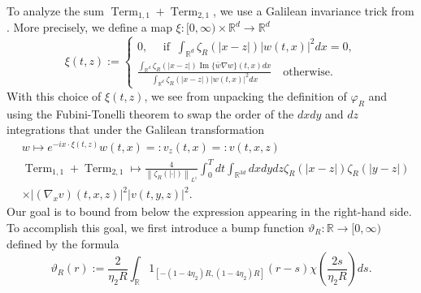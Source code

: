 \documentclass[reqno,11pt]{amsart}
\theoremstyle{plain}
\theoremstyle{definition}
\numberwithin{equation}{section}
\numberwithin{theorem}{section}
\begin{document}
To analyze the sum $\operatorname{Term}_{1,1}+\operatorname{Term}_{2,1}$, we use a Galilean invariance trick from \cite{Dodson-Adv}. More precisely, we define a map $\xi:[0, \infty) \times \mathbb{R}^{d} \rightarrow \mathbb{R}^{d}$
\begin{equation*}
\xi(t, z):=
\begin{cases}
0, \quad \text{ if }\ \int_{\mathbb{R}^{d}} \zeta_{R}\left(\left| x-z\right|\right)|w(t, x)|^{2} d x=0,\\
    \frac{\int_{\mathbb{R}^{d}} \zeta_{R}\left(\left| x-z\right|\right) \operatorname{Im}\{\bar{w} \nabla w\}(t, x) d x}{\int_{\mathbb{R}^{d}} \zeta_{R}\left(\left| x-z\right|\right)|w(t, x)|^{2} d x} \quad \text{otherwise}.
\end{cases}
\end{equation*}
 With this choice of $\xi(t, z)$, we see from unpacking the definition of $\varphi_{R}$ and using the Fubini-Tonelli theorem to swap the order of the $d x d y$ and $d z$ integrations that under the Galilean transformation
\begin{align*}
& w \mapsto e^{-i x \cdot \xi(t, z)} w(t, x)=: v_{z}(t, x)=: v(t, x, z)  \\
& \operatorname{Term}_{1,1}+\operatorname{Term}_{2,1} \mapsto \frac{4}{\left\|\zeta_{R}(|\cdot|)\right\|_{L^{1}}} \int_{0}^{T} d t  \int_{\mathbb{R}^{3d}} d x d y d z \zeta_{R}\left(\left|x-z\right|\right) \zeta_{R}\left(\left|y-z\right|\right) \\
& \times\left|\left(\nabla_{x} v\right)(t, x, z)\right|^{2}|v(t, y,z)|^{2}.
\end{align*}
Our goal is to bound from below the expression appearing in the right-hand side. To accomplish this goal, we first introduce a bump function $\vartheta_{R}: \mathbb{R} \rightarrow[0, \infty)$ defined by the formula 
\begin{equation}\label{equ:varthetadef}
\vartheta_{R}(r):=\frac{2}{\eta_{2} R} \int_{\mathbb{R}} 1_{\left[-\left(1-4 \eta_{2} \right)R,\left(1-4 \eta_{2}\right) R\right]}(r-s) \chi\left(\frac{2 s}{\eta_{2} R}\right) d s.
\end{equation}
\end{document}
